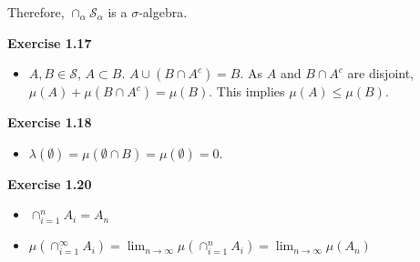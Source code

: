 \documentclass[letterpaper,12pt]{article}
\begin{document}
Therefore, $\cap_\alpha \mathcal{S}_\alpha$ is a $\sigma$-algebra.

\textbf{Exercise 1.17}

\begin{itemize}
  \item $A, B \in \mathcal{S}$, $A \subset B$. $A \cup (B \cap A^c) = B$. As $A$ and $B \cap A^c$ are disjoint, $\mu(A) + \mu(B \cap A^c) = \mu(B)$. This implies $\mu(A) \leq \mu(B)$.
\end{itemize}

\textbf{Exercise 1.18}

\begin{itemize}
  \item $\lambda(\emptyset) = \mu(\emptyset \cap B) = \mu(\emptyset) = 0$.
\end{itemize}

\textbf{Exercise 1.20}

\begin{itemize}
  \item $\cap_{i=1}^n A_i = A_n$
  \item $\mu (\cap_{i=1}^\infty A_i) = 
         \lim_{n \to \infty} \mu (\cap_{i=1}^n A_i)
        = \lim_{n \to \infty} \mu(A_n)$
\end{itemize}
\end{document}
